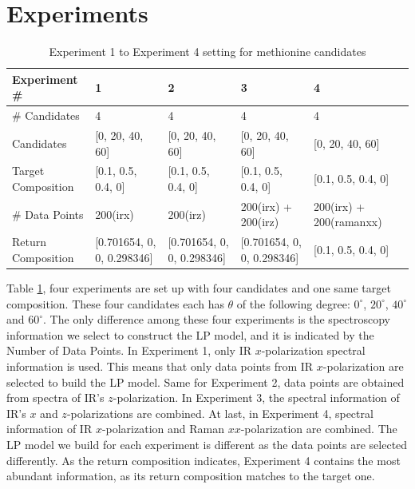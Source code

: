 \section{Experiments}
\begin{table}\tiny 
\begin{tabular}{| l | l | l | l | l | l }
\hline
Experiment \# & 1 & 2 & 3 & 4 \\
\hline
\# Candidates & 4 & 4 & 4 & 4 \\
\hline
Candidates & [0, 20, 40, 60] & [0, 20, 40, 60] & [0, 20, 40, 60] & [0, 20, 40, 60]\\
\hline
Target Composition & [0.1, 0.5, 0.4, 0] & [0.1, 0.5, 0.4, 0] & [0.1, 0.5, 0.4, 0] & [0.1, 0.5, 0.4, 0]\\
\hline
\# Data Points & 200(irx) & 200(irz) & 200(irx) + 200(irz) & 200(irx) + 200(ramanxx)\\
\hline
Return Composition & [0.701654, 0, 0, 0.298346] & [0.701654, 0, 0, 0.298346] & [0.701654, 0, 0, 0.298346] & [0.1, 0.5, 0.4, 0]\\
\hline
\end{tabular} 
\caption{Experiment 1 to Experiment 4 setting for methionine candidates} 
\label{tab:4.1}
\end{table}	

Table \ref{tab:4.1}, four experiments are set up with four candidates and one same target composition. These four candidates each has $\theta$ of the following degree: $0^{\circ}$, $20^{\circ}$, $40^{\circ}$ and $60^{\circ}$. The only difference among these four experiments is the spectroscopy information we select to construct the LP model, and it is indicated by the Number of Data Points. In Experiment 1, only IR $x$-polarization spectral information is used. This means that only data points from IR $x$-polarization are selected to build the LP model. Same for Experiment 2, data points are obtained from spectra of IR's $z$-polarization. In Experiment 3, the spectral information of IR's $x$ and $z$-polarizations are combined. At last, in Experiment 4, spectral information of IR $x$-polarization and Raman $xx$-polarization are combined. The LP model we build for each experiment is different as the data points are selected differently. As the return composition indicates, 
Experiment 4 contains the most abundant information, as its return composition matches to the target one. \\

